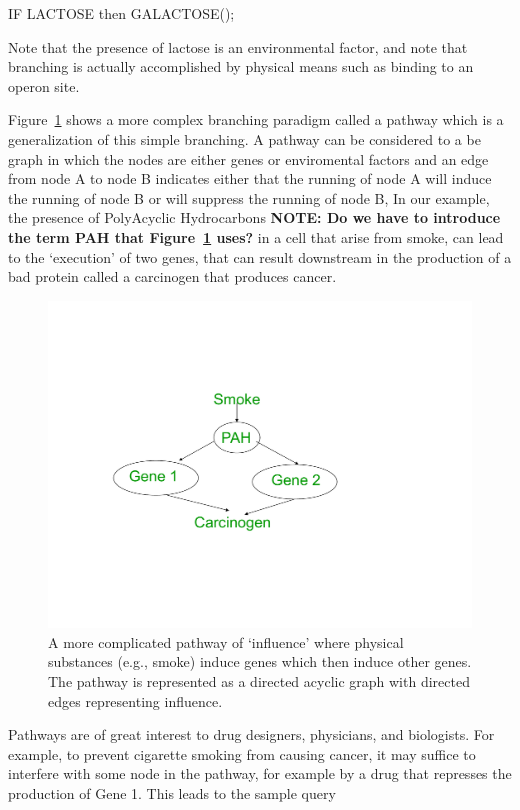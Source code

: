 \documentclass[10pt,fullpage]{article}
\newcommand{\fref}[1]{\mbox{Figure~\ref{#1}}}
\begin{document}
IF LACTOSE then GALACTOSE(); 

Note that the presence of lactose is an environmental factor, and note
that branching is actually accomplished by physical means such as
binding to an operon site.

Figure~\ref{fig:pathway} shows a more complex branching paradigm
called a pathway which is a generalization of this simple branching.
A pathway can be considered to a be graph in which the nodes are
either genes or enviromental factors and an edge from node A to node B
indicates either that the running of node A will induce the running of
node B or will suppress the running of node B, In our example, the
presence of PolyAcyclic Hydrocarbons {\bf NOTE: Do we have to introduce
the term PAH that \fref{fig:pathway} uses?} in a cell that arise from smoke,
can lead to the `execution' of two genes, that can result downstream
in the production of a bad protein called a carcinogen that produces
cancer.

\begin{figure}[h!]
  \centering
  \includegraphics[trim = 40mm 60mm 40mm 40mm, clip, width=4.5in]{fig/pathway.pdf}
  \caption{A more complicated pathway of `influence' where
    physical substances (e.g., smoke) induce genes which then induce
    other genes.  The pathway is represented as a directed acyclic
    graph with directed edges representing influence.}
  \label{fig:pathway}
\end{figure}


Pathways are of great interest to drug designers, physicians, and
biologists.  For example, to prevent cigarette smoking from causing
cancer, it may suffice to interfere with some node in the pathway, for
example by a drug that represses the production of Gene 1.  This leads
to the sample query
\end{document}
